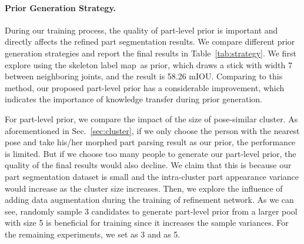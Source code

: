 \documentclass[10pt,twocolumn,letterpaper]{article}
\begin{document}
\paragraph{Prior Generation Strategy.}
\label{para:strategy}
During our training process, the quality of part-level prior is important and directly affects the refined part segmentation results. We compare different prior generation strategies and report the final results in Table~\ref{tab:strategy}. We first explore using the skeleton label map~\cite{xia2017joint}as prior, which draws a stick with
width 7 between neighboring joints, and the result is 58.26 mIOU. Comparing to this method, our proposed part-level prior has a considerable improvement, which indicates the importance of knowledge transfer during prior generation.

For part-level prior, we compare the impact of the size  of pose-similar cluster. As aforementioned in Sec.~\ref{sec:cluster}, if we only choose the person with the nearest pose and take his/her morphed part parsing result as our prior, the performance is limited. But if we choose too many people to generate our part-level prior, the quality of the final results would also decline. We claim that this is because our part segmentation dataset is small and the intra-cluster part appearance variance would increase as the cluster size increases. Then, we explore the influence of adding data augmentation during the training of refinement network. As we can see, randomly sample 3 candidates to generate part-level prior from a larger pool with size 5 is beneficial for training since it increases the sample variances. For the remaining experiments, we set  as 3 and  as 5.
\vspace{-3mm}
\end{document}

